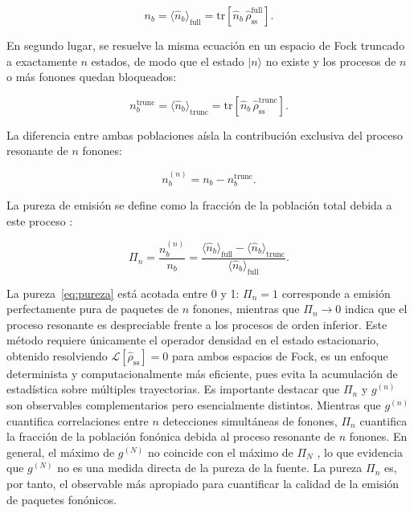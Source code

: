 \begin{equation}
	n_b = \langle\hat{n}_b\rangle_\text{full}
	= \mathrm{tr}\!\left[\hat{n}_b\,\hat{\rho}_\text{ss}^\text{full}
	\right].
	\label{eq:nb_full}
\end{equation}

En segundo lugar, se resuelve la misma ecuación en un espacio de Fock truncado a exactamente $n$ estados, de modo que el estado $|n\rangle$ no existe y los procesos de $n$ o más fonones quedan bloqueados:

\begin{equation}
	n_b^\text{trunc} = \langle\hat{n}_b\rangle_\text{trunc}
	= \mathrm{tr}\!\left[\hat{n}_b\,\hat{\rho}_\text{ss}^\text{trunc}
	\right].
	\label{eq:nb_trunc}
\end{equation}

La diferencia entre ambas poblaciones aísla la contribución exclusiva del proceso resonante de $n$ fonones:

\begin{equation}
	n_b^{(n)} = n_b - n_b^\text{trunc}.
	\label{eq:nb_n}
\end{equation}

La pureza de emisión se define como la fracción de la población total debida a este proceso \cite{munoz2018}:

\begin{equation}
	\Pi_n = \frac{n_b^{(n)}}{n_b} =
	\frac{\langle\hat{n}_b\rangle_\text{full} -
		\langle\hat{n}_b\rangle_\text{trunc}}
	{\langle\hat{n}_b\rangle_\text{full}}.
	\label{eq:pureza}
\end{equation}

La pureza~\eqref{eq:pureza} está acotada entre 0 y 1: $\Pi_n = 1$ corresponde a emisión perfectamente pura de paquetes de $n$ fonones, mientras que $\Pi_n \to 0$ indica que el proceso resonante es despreciable frente a los procesos de orden inferior. Este método requiere únicamente el operador densidad en el estado estacionario, obtenido resolviendo $\mathcal{L}[\hat{\rho}_\text{ss}] = 0$ para ambos espacios de Fock, es un enfoque determinista y computacionalmente más eficiente, pues evita la acumulación de estadística sobre múltiples trayectorias. Es importante destacar que $\Pi_n$ y $g^{(n)}$ son observables complementarios pero esencialmente distintos. Mientras que $g^{(n)}$ cuantifica correlaciones entre $n$ detecciones simultáneas de fonones, $\Pi_n$ cuantifica la fracción de la población fonónica debida al proceso resonante de $n$ fonones. En general, el máximo de $g^{(N)}$ no coincide con el máximo de $\Pi_N$ \cite{munoz2014}, lo que evidencia que $g^{(N)}$ no es una medida directa de la pureza de la fuente. La pureza $\Pi_n$ es, por tanto, el observable más apropiado para cuantificar la calidad de la emisión de paquetes fonónicos.